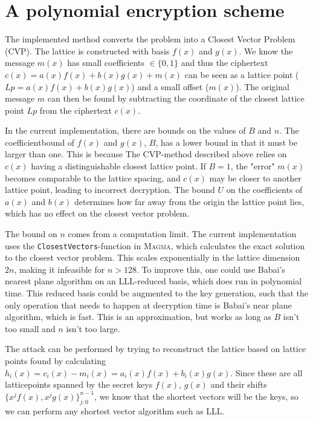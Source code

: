 \documentclass{article}
\begin{document}
\section{A polynomial encryption scheme}
The implemented method converts the problem into a Closest Vector Problem (CVP). The lattice is constructed with basis $f(x)$ and $g(x)$. We know the message $m(x)$ has small coefficients $\in \{0, 1\}$ and thus the ciphertext $c(x) = a(x)f(x) + b(x)g(x) + m(x)$ can be seen as a lattice point ($Lp = a(x)f(x)+b(x)g(x)$) and a small offset ($m(x)$). The original message $m$ can then be found by subtracting the coordinate of the closest lattice point $Lp$ from the ciphertext $c(x)$.

In the current implementation, there are bounds on the values of $B$ and $n$. The coefficientbound of $f(x)$ and $g(x)$, $B$, has a lower bound in that it must be larger than one. This is because The CVP-method described above relies on $c(x)$ having a distinguishable closest lattice point. If $B = 1$, the "error" $m(x)$ becomes comparable to the lattice spacing, and $c(x)$ may be closer to another lattice point, leading to incorrect decryption. The bound $U$ on the coefficients of $a(x)$ and $b(x)$ determines how far away from the origin the lattice point lies, which has no effect on the closest vector problem.

The bound on $n$ comes from a computation limit. The current implementation uses the \texttt{ClosestVectors}-function in \textsc{Magma}, which calculates the exact solution to the closest vector problem. This scales exponentially in the lattice dimension $2n$, making it infeasible for $n > 128$. To improve this, one could use Babai's nearest plane algorithm on an LLL-reduced basis, which does run in polynomial time. This reduced basis could be augmented to the key generation, such that the only operation that needs to happen at decryption time is Babai's near plane algorithm, which is fast. This is an approximation, but works as long as $B$ isn't too small and $n$ isn't too large.

The attack can be performed by trying to reconstruct the lattice based on lattice points found by calculating $h_i(x) = c_i(x) - m_i(x) = a_i(x)f(x)+b_i(x)g(x)$. Since these are all latticepoints spanned by the secret keys $f(x)$, $g(x)$ and their shifts $\{x^jf(x),x^jg(x) \}^{n-1}_{j:0}$, we know that the shortest vectors will be the keys, so we can perform any shortest vector algorithm such as LLL.
\end{document}
